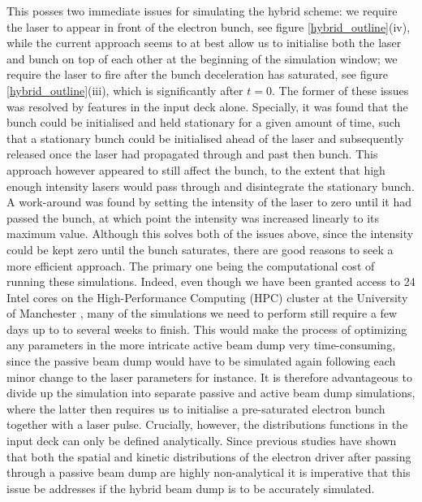\indent This posses two immediate issues for simulating the hybrid scheme: we require the laser to appear in front of the electron bunch, see figure \ref{hybrid_outline}(iv), while the current approach seems to at best allow us to initialise both the laser and bunch on top of each other at the beginning of the simulation window; we require the laser to fire after the bunch deceleration has saturated, see figure \ref{hybrid_outline}(iii), which is significantly after $t=0$. The former of these issues was resolved by features in the input deck alone. Specially, it was found that the bunch could be initialised and held stationary for a given amount of time, such that a stationary bunch could be initialised ahead of the laser and subsequently released once the laser had propagated through and past then bunch. This approach however appeared to still affect the bunch, to the extent that high enough intensity lasers would pass through and disintegrate the stationary bunch. A work-around was found by setting the intensity of the laser to zero until it had passed the bunch, at which point the intensity was increased linearly to its maximum value. Although this solves both of the issues above, since the intensity could be kept zero until the bunch saturates, there are good reasons to seek a more efficient approach. The primary one being the computational cost of running these simulations. Indeed, even though we have been granted access to 24 Intel cores on the High-Performance Computing (HPC) cluster at the University of Manchester \cite{CSF}, many of the simulations we need to perform still require a few days up to to several weeks to finish. This would make the process of optimizing any parameters in the more intricate active beam dump very time-consuming, since the passive beam dump would have to be simulated again following each minor change to the laser parameters for instance. It is therefore advantageous to divide up the simulation into separate passive and active beam dump simulations, where the latter then requires us to initialise a pre-saturated electron bunch together with a laser pulse.
Crucially, however, the distributions functions in the input deck can only be defined analytically. Since previous studies \cite{Wu2010, Bonatto2015, Hanahoe2017} have shown that both the spatial and kinetic distributions of the electron driver after passing through a passive beam dump are highly non-analytical it is imperative that this issue be addresses if the hybrid beam dump is to be accurately simulated. 

